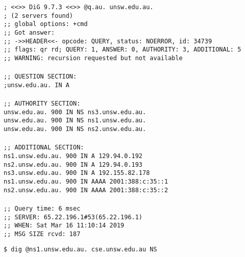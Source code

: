 \documentclass[a4paper,11pt]{article}
\newcommand{\code}{\texttt}
\begin{document}
\begin{enumerate}[leftmargin=*]
	\code{; <<>> DiG 9.7.3 <<>> @q.au. unsw.edu.au.\\
	; (2 servers found)\\
	;; global options: +cmd\\
	;; Got answer:\\
	;; ->>HEADER<<- opcode: QUERY, status: NOERROR, id: 34739\\
	;; flags: qr rd; QUERY: 1, ANSWER: 0, AUTHORITY: 3, ADDITIONAL: 5\\
	;; WARNING: recursion requested but not available\\
	\\
	;; QUESTION SECTION:\\
	;unsw.edu.au.			IN	A\\
	\\
	;; AUTHORITY SECTION:\\
	unsw.edu.au.		900	IN	NS	ns3.unsw.edu.au.\\
	unsw.edu.au.		900	IN	NS	ns1.unsw.edu.au.\\
	unsw.edu.au.		900	IN	NS	ns2.unsw.edu.au.\\
	\\
	;; ADDITIONAL SECTION:\\
	ns1.unsw.edu.au.	900	IN	A	129.94.0.192\\
	ns2.unsw.edu.au.	900	IN	A	129.94.0.193\\
	ns3.unsw.edu.au.	900	IN	A	192.155.82.178\\
	ns1.unsw.edu.au.	900	IN	AAAA	2001:388:c:35::1\\
	ns2.unsw.edu.au.	900	IN	AAAA	2001:388:c:35::2\\
	\\
	;; Query time: 6 msec\\
	;; SERVER: 65.22.196.1\#53(65.22.196.1)\\
	;; WHEN: Sat Mar 16 11:10:14 2019\\
	;; MSG SIZE  rcvd: 187\\}

	\code{\$ dig @ns1.unsw.edu.au. cse.unsw.edu.au NS}


\end{enumerate}
\end{document}
